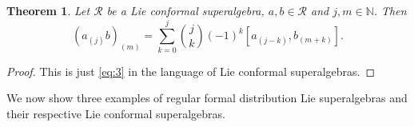 \documentclass[a4paper, 12pt, reqno]{amsart}
\newtheorem{theorem}{Theorem}[section]
\theoremstyle{remark}
\numberwithin{equation}{subsection}
\begin{document}
\begin{theorem}
  \label{thr:10}
  Let $\mathcal{R}$ be a Lie conformal superalgebra, $a, b \in \mathcal{R}$ and $j, m \in \mathbb{N}$.
  Then
  \begin{equation*}
    (a_{(j)}b)_{(m)} = \sum_{k = 0}^j\binom{j}{k}(-1)^k[a_{(j - k)},b_{(m + k)}].
  \end{equation*}
\end{theorem}

\begin{proof}
  This is just \eqref{eq:3} in the language of Lie conformal superalgebras.
\end{proof}

We now show three examples of regular formal distribution Lie superalgebras and their respective Lie conformal superalgebras.
\end{document}
